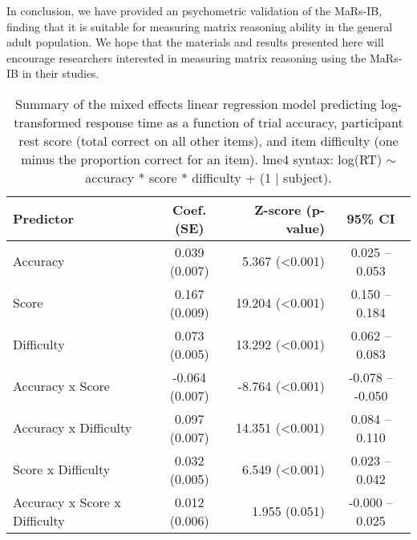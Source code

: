 \documentclass[a4paper,man,natbib]{apa6}
\begin{document}
In conclusion, we have provided an psychometric validation of the MaRs-IB, finding that it is suitable for measuring matrix reasoning ability in the general adult population. We hope that the materials and results presented here will encourage researchers interested in measuring matrix reasoning using the MaRs-IB in their studies. 



\begin{table}[]
\centering
\begin{tabular*}{\textwidth}{lc@{\hskip 6mm}r@{\hskip 6mm}c}
\toprule
Predictor &  Coef. (SE) & Z-score (p-value) & 95\% CI  \\
\midrule
Accuracy & 0.039 (0.007) &   5.367 (<0.001) &  0.025 -- 0.053  \\
Score &  0.167 (0.009) &  19.204 (<0.001) &  0.150 -- 0.184  \\
Difficulty & 0.073 (0.005) &  13.292 (<0.001) &  0.062 -- 0.083  \\
Accuracy x Score & -0.064 (0.007) &  -8.764 (<0.001) & -0.078 -- -0.050  \\
Accuracy x Difficulty & 0.097 (0.007) &  14.351 (<0.001) &  0.084 -- 0.110  \\
Score x Difficulty &  0.032 (0.005) &   6.549 (<0.001) &  0.023 -- 0.042  \\
Accuracy x Score x Difficulty &  0.012 (0.006) & 1.955 (0.051) & -0.000 -- 0.025  \\
\bottomrule
\end{tabular*}
\caption{\label{table:1}\normalfont Summary of the mixed effects linear regression model predicting log-transformed response time as a function of trial accuracy, participant rest score (total correct on all other items), and item difficulty (one minus the proportion correct for an item). \newline lme4 syntax: log(RT) $\sim$ accuracy * score * difficulty + (1 | subject).}
\end{table}
\end{document}
